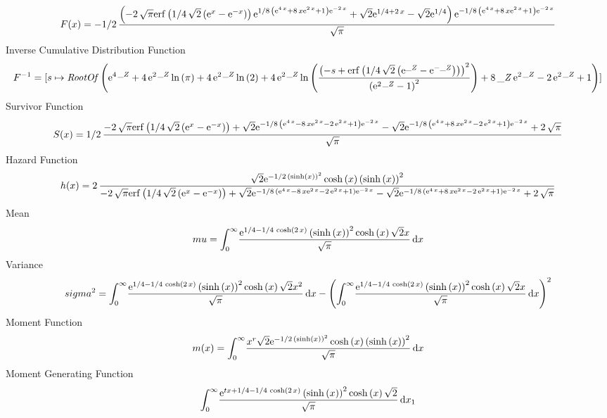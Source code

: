 \documentclass[12pt]{article}
\begin{document}
 $$F(x)=-1/2\,{\frac { \left( -2\,\sqrt {\pi}{\rm erf} \left(1/4\,\sqrt {2}
 \left( {{\rm e}^{x}}-{{\rm e}^{-x}} \right) \right){{\rm e}^{1/8\,
 \left( {{\rm e}^{4\,x}}+8\,x{{\rm e}^{2\,x}}+1 \right) {{\rm e}^{-2\,
x}}}}+\sqrt {2}{{\rm e}^{1/4+2\,x}}-\sqrt {2}{{\rm e}^{1/4}} \right) {
{\rm e}^{-1/8\, \left( {{\rm e}^{4\,x}}+8\,x{{\rm e}^{2\,x}}+1
 \right) {{\rm e}^{-2\,x}}}}}{\sqrt {\pi}}}
$$ Inverse Cumulative Distribution Function 
  $$F^{-1} = [s\mapsto {\it RootOf} \left( {{\rm e}^{4\,{\it \_Z}}}+4\,{{\rm e}^{2
\,{\it \_Z}}}\ln  \left( \pi \right) +4\,{{\rm e}^{2\,{\it \_Z}}}\ln 
 \left( 2 \right) +4\,{{\rm e}^{2\,{\it \_Z}}}\ln  \left( {\frac {
 \left( -s+{\rm erf} \left(1/4\,\sqrt {2} \left( {{\rm e}^{{\it \_Z}}}
-{{\rm e}^{-{\it \_Z}}} \right) \right) \right) ^{2}}{ \left( {{\rm e}
^{2\,{\it \_Z}}}-1 \right) ^{2}}} \right) +8\,{\it \_Z}\,{{\rm e}^{2\,
{\it \_Z}}}-2\,{{\rm e}^{2\,{\it \_Z}}}+1 \right) ]
$$Survivor Function 
 $$ S(x)=1/2\,{\frac {-2\,\sqrt {\pi}{\rm erf} \left(1/4\,\sqrt {2} \left( {
{\rm e}^{x}}-{{\rm e}^{-x}} \right) \right)+\sqrt {2}{{\rm e}^{-1/8\,
 \left( {{\rm e}^{4\,x}}-8\,x{{\rm e}^{2\,x}}-2\,{{\rm e}^{2\,x}}+1
 \right) {{\rm e}^{-2\,x}}}}-\sqrt {2}{{\rm e}^{-1/8\, \left( {{\rm e}
^{4\,x}}+8\,x{{\rm e}^{2\,x}}-2\,{{\rm e}^{2\,x}}+1 \right) {{\rm e}^{
-2\,x}}}}+2\,\sqrt {\pi}}{\sqrt {\pi}}}
$$ Hazard Function 
 $$ h(x)=2\,{\frac {\sqrt {2}{{\rm e}^{-1/2\, \left( \sinh \left( x \right) 
 \right) ^{2}}}\cosh \left( x \right)  \left( \sinh \left( x \right) 
 \right) ^{2}}{-2\,\sqrt {\pi}{\rm erf} \left(1/4\,\sqrt {2} \left( {
{\rm e}^{x}}-{{\rm e}^{-x}} \right) \right)+\sqrt {2}{{\rm e}^{-1/8\,
 \left( {{\rm e}^{4\,x}}-8\,x{{\rm e}^{2\,x}}-2\,{{\rm e}^{2\,x}}+1
 \right) {{\rm e}^{-2\,x}}}}-\sqrt {2}{{\rm e}^{-1/8\, \left( {{\rm e}
^{4\,x}}+8\,x{{\rm e}^{2\,x}}-2\,{{\rm e}^{2\,x}}+1 \right) {{\rm e}^{
-2\,x}}}}+2\,\sqrt {\pi}}}
$$Mean 
 $$ mu=\int_{0}^{\infty }\!{\frac {{{\rm e}^{1/4-1/4\,\cosh \left( 2\,x
 \right) }} \left( \sinh \left( x \right)  \right) ^{2}\cosh \left( x
 \right) \sqrt {2}x}{\sqrt {\pi}}}\,{\rm d}x
$$ Variance 
 $$ sigma^2 = \int_{0}^{\infty }\!{\frac {{{\rm e}^{1/4-1/4\,\cosh \left( 2\,x
 \right) }} \left( \sinh \left( x \right)  \right) ^{2}\cosh \left( x
 \right) \sqrt {2}{x}^{2}}{\sqrt {\pi}}}\,{\rm d}x- \left( \int_{0}^{
\infty }\!{\frac {{{\rm e}^{1/4-1/4\,\cosh \left( 2\,x \right) }}
 \left( \sinh \left( x \right)  \right) ^{2}\cosh \left( x \right) 
\sqrt {2}x}{\sqrt {\pi}}}\,{\rm d}x \right) ^{2}
$$Moment Function 
 $$ m(x) = \int_{0}^{\infty }\!{\frac {{x}^{r}\sqrt {2}{{\rm e}^{-1/2\, \left( 
\sinh \left( x \right)  \right) ^{2}}}\cosh \left( x \right)  \left( 
\sinh \left( x \right)  \right) ^{2}}{\sqrt {\pi}}}\,{\rm d}x
$$ Moment Generating Function 
 $$\int_{0}^{\infty }\!{\frac {{{\rm e}^{tx+1/4-1/4\,\cosh \left( 2\,x
 \right) }} \left( \sinh \left( x \right)  \right) ^{2}\cosh \left( x
 \right) \sqrt {2}}{\sqrt {\pi}}}\,{\rm d}x_{{1}}
$$
\end{document}
